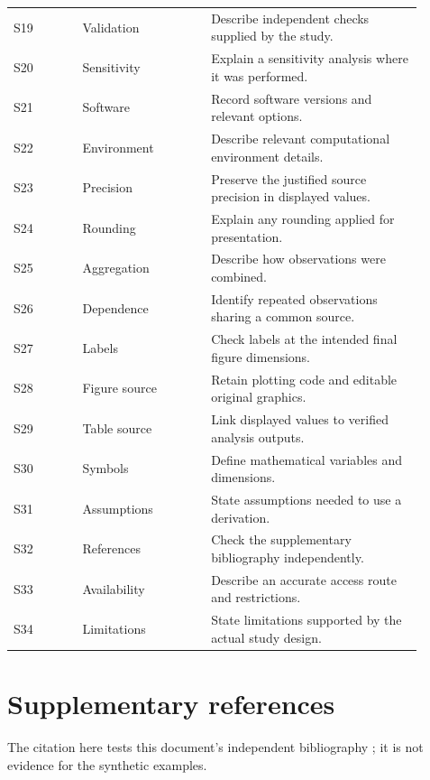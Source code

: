 \documentclass[11pt]{article}
\begin{document}
\begin{longtable}{@{}p{0.15\linewidth}p{0.29\linewidth}p{0.46\linewidth}@{}}
S19 & Validation & Describe independent checks supplied by the study.\\
S20 & Sensitivity & Explain a sensitivity analysis where it was performed.\\
S21 & Software & Record software versions and relevant options.\\
S22 & Environment & Describe relevant computational environment details.\\
S23 & Precision & Preserve the justified source precision in displayed values.\\
S24 & Rounding & Explain any rounding applied for presentation.\\
S25 & Aggregation & Describe how observations were combined.\\
S26 & Dependence & Identify repeated observations sharing a common source.\\
S27 & Labels & Check labels at the intended final figure dimensions.\\
S28 & Figure source & Retain plotting code and editable original graphics.\\
S29 & Table source & Link displayed values to verified analysis outputs.\\
S30 & Symbols & Define mathematical variables and dimensions.\\
S31 & Assumptions & State assumptions needed to use a derivation.\\
S32 & References & Check the supplementary bibliography independently.\\
S33 & Availability & Describe an accurate access route and restrictions.\\
S34 & Limitations & State limitations supported by the actual study design.\\
\end{longtable}
\normalsize

\section{Supplementary references}
The citation here tests this document's independent bibliography
\cite{wilkinson2016fair}; it is not evidence for the synthetic examples.
\renewcommand{\bibsection}{} %


\end{document}
